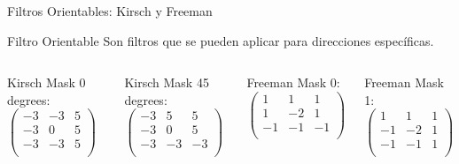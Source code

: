 \documentclass{beamer}
\begin{document}
\begin{frame}{Filtros Orientables: Kirsch y Freeman}

\begin{block}{Filtro Orientable}
Son filtros que se pueden aplicar para direcciones específicas.
\end{block}
\begin{columns}
\column[t]{5cm}
\begin{center}
 Kirsch Mask 0 degrees:\\

\begin{math}
   \begin{pmatrix} 
   -3 & -3 & 5 \\ 
   -3 & 0 & 5 \\
   -3 & -3 & 5 \\ 
   \end{pmatrix}
\end{math}
\end{center}

\begin{center}
 Kirsch Mask 45 degrees:\\

\begin{math}
   \begin{pmatrix} 
   -3 & 5 & 5 \\ 
   -3 & 0 & 5 \\
   -3 & -3 & -3 \\  
   \end{pmatrix}
\end{math}
\end{center}

\column[t]{5cm}
\begin{center}
 Freeman Mask 0:\\

\begin{math}
   \begin{pmatrix} 
   1 & 1 & 1 \\ 
   1 & -2 & 1 \\
   -1 & -1 & -1 \\ 
   \end{pmatrix}
\end{math}
\end{center}

\begin{center}
 Freeman Mask 1:\\

\begin{math}
   \begin{pmatrix} 
   1 & 1 & 1 \\ 
   -1 & -2 & 1 \\
   -1 & -1 & 1 \\  
   \end{pmatrix}
\end{math}
\end{center}

\end{columns}

\end{frame}
\end{document}

